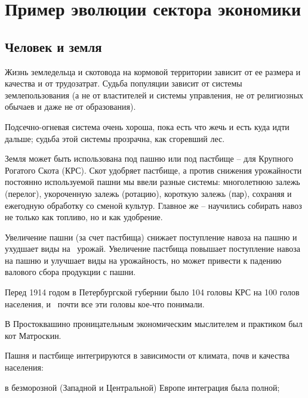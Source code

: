 %
%
\section[Пример эволюции сектора экономики]{Пример эволюции сектора экономики}
\subsection[Человек и земля]{Человек и земля}

Жизнь земледельца и скотовода на кормовой территории зависит от ее размера и качества и от трудозатрат. Судьба популяции
зависит от системы землепользования (а не от властителей и системы управления, не от религиозных обычаев и даже не от
образования).


Подсечно-огневая система очень хороша, пока есть что жечь и есть куда идти дальше; судьба этой системы прозрачна, как
сгоревший лес.


Земля может быть использована под пашню или под пастбище – для Крупного Рогатого Скота (КРС). Скот удобряет пастбище, а
против снижения урожайности постоянно используемой пашни мы ввели разные системы: многолетнюю залежь (перелог),
укороченную залежь (ротацию), короткую залежь (пар), сохраняя и ежегодную обработку со сменой культур. Главное же –
научились собирать навоз не только как топливо, но и как удобрение.


Увеличение пашни (за счет пастбища) снижает поступление навоза на пашню и ухудшает виды на \ урожай. Увеличение пастбища
повышает поступление навоза на пашню и улучшает виды на урожайность, но может привести к падению валового сбора
продукции с пашни.

Перед 1914 годом в Петербургской губернии было 104 головы КРС на 100 голов населения, и \ почти все эти головы кое-что
понимали.

В Простоквашино проницательным экономическим мыслителем и практиком был кот Матроскин.


Пашня и пастбище интегрируются в зависимости от климата, почв и качества населения:


в безморозной (Западной и Центральной) Европе интеграция была полной;


